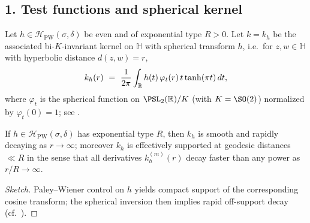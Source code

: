 \subsection*{1. Test functions and spherical kernel}\relax\hspace{0pt}
\label{subsec:tfc4-kernel} %

Let $h\in\mathcal{H}_{\mathrm{PW}}(\sigma,\delta)$ be even and of exponential type $R>0$. \relax\hspace{0pt}
Let $k=k_h$ be the associated bi-$K$-invariant kernel on $\mathbb{H}$ with spherical transform $h$, i.e.\ for $z,w\in\mathbb{H}$ with hyperbolic distance $d(z,w)=r$,
\begin{equation}\relax\hspace{0pt}
\label{eq:tfc4-kernel}\relax\hspace{0pt}
k_h(r)\ =\ \frac{1}{2\pi}\int_{\mathbb{R}} h(t)\,\varphi_t(r)\,t\tanh(\pi t)\,dt,
\end{equation}
where $\varphi_t$ is the spherical function on $\PSL_2(\mathbb{R})/K$ (with $K=\SO(2)$) normalized by $\varphi_t(0)=1$; see \cite{Helgason,GangolliVaradarajan,HejhalI}. \relax\hspace{0pt}

\begin{lemma}\relax\hspace{0pt}
\label{lem:tfc4-kprofile} %
If $h\in\mathcal{H}_{\mathrm{PW}}(\sigma,\delta)$ has exponential type $R$, then $k_h$ is smooth and rapidly decaying as $r\to\infty$; moreover $k_h$ is effectively supported at geodesic distances $\ll R$ in the sense that all derivatives $k_h^{(m)}(r)$ decay faster than any power as $r/R\to\infty$.\relax\hspace{0pt}
\end{lemma}

\begin{proof}[Sketch]\relax\hspace{0pt}
Paley--Wiener control on $h$ yields compact support of the corresponding cosine transform; the spherical inversion then implies rapid off-support decay (cf.\ \cite{GangolliVaradarajan,Helgason}).\relax\hspace{0pt}
\end{proof}

